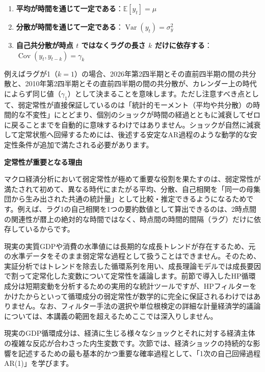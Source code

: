 \documentclass[
  japanese,
  lualatex,
  ja=standard,
  12pt,
  a4paper]{ltjsarticle}
\providecommand{\tightlist}{%
  \setlength{\itemsep}{0pt}\setlength{\parskip}{0pt}}
\begin{document}
\begin{enumerate}
\def\labelenumi{\arabic{enumi}.}
\tightlist
\item
  \textbf{平均が時間を通じて一定である}：\(\mathbb{E}[y_t] = \mu\)
\item
  \textbf{分散が時間を通じて一定である}：\(\operatorname{Var}(y_t) = \sigma_y^2\)
\item
  \textbf{自己共分散が時点 \(t\) ではなくラグの長さ \(k\)
  だけに依存する}：\(\operatorname{Cov}(y_t, y_{t-k}) = \gamma_k\)
\end{enumerate}

例えばラグが1（\(k=1\)）の場合、2026年第2四半期とその直前四半期の間の共分散と、2010年第2四半期とその直前四半期の間の共分散が、カレンダー上の時代によらず同じ値（\(\gamma_1\)）として決まることを意味します。ただし注意すべき点として、弱定常性が直接保証しているのは「統計的モーメント（平均や共分散）の時間的な不変性」にとどまり、個別のショックが時間の経過とともに減衰してゼロに戻ることまでを自動的に意味するわけではありません。ショックが自然に減衰して定常状態へ回帰するためには、後述する安定なAR過程のような動学的な安定性条件が追加で満たされる必要があります。

\textbf{定常性が重要となる理由}

マクロ経済分析において弱定常性が極めて重要な役割を果たすのは、弱定常性が満たされて初めて、異なる時代にまたがる平均、分散、自己相関を「同一の母集団から生み出された共通の統計量」として比較・推定できるようになるためです。例えば、ラグ1の自己相関を1つの要約数値として算出できるのは、2時点間の関連性が暦上の絶対的な時間ではなく、時点間の時間的間隔（ラグ）だけに依存しているからです。

現実の実質GDPや消費の水準値には長期的な成長トレンドが存在するため、元の水準データをそのまま弱定常な過程として扱うことはできません。そのため、実証分析ではトレンドを除去した循環系列を用い、成長理論モデルでは成長要因で割って定常化した変数について定常性を議論します。前節で導入したHP循環成分は短期変動を分析するための実用的な統計ツールですが、HPフィルターをかけたからといって循環成分の弱定常性が数学的に完全に保証されるわけではありません。なお、フィルター手法の選択や単位根検定の詳細な計量経済学的議論については、本講義の範囲を超えるためここでは深入りしません。

現実のGDP循環成分は、経済に生じる様々なショックとそれに対する経済主体の複雑な反応が合わさった内生変数です。次節では、経済ショックの持続的な影響を記述するための最も基本的かつ重要な確率過程として、「1次の自己回帰過程
AR(1)」を学びます。

\end{document}
